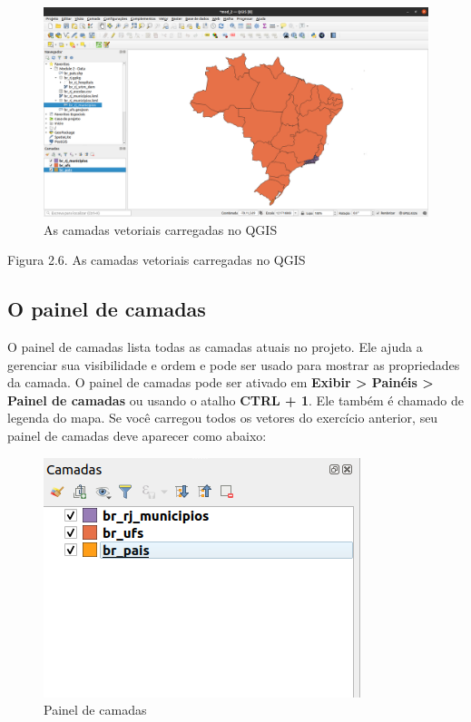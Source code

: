 \documentclass[
]{krantz}
\begin{document}
\begin{figure}
\centering
\includegraphics{media/modulo2/vector-layers-loaded-1.png}
\caption{As camadas vetoriais carregadas no QGIS}
\end{figure}

Figura 2.6. As camadas vetoriais carregadas no QGIS

\hypertarget{o-painel-de-camadas}{%
\subsection{O painel de camadas}\label{o-painel-de-camadas}}

O painel de camadas lista todas as camadas atuais no projeto. Ele ajuda a gerenciar sua visibilidade e ordem e pode ser usado para mostrar as propriedades da camada. O painel de camadas pode ser ativado em \textbf{Exibir \textgreater{} Painéis \textgreater{} Painel de camadas} ou usando o atalho \textbf{CTRL + 1}. Ele também é chamado de legenda do mapa. Se você carregou todos os vetores do exercício anterior, seu painel de camadas deve aparecer como abaixo:

\begin{figure}
\centering
\includegraphics{media/modulo2/layers-panel-1.png}
\caption{Painel de camadas}
\end{figure}
\end{document}
